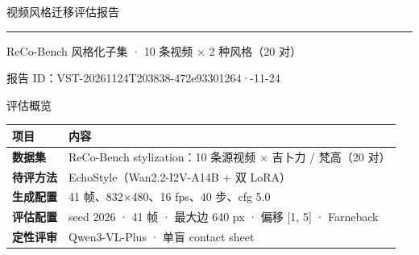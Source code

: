 \documentclass[aspectratio=169,11pt]{beamer}
\newcommand{\headrow}[1]{\color{white}\bfseries #1}
\begin{document}
\begin{frame}[plain]
\vspace{2.2cm}
{\color{white} 视频风格迁移评估报告\par}
\vspace{0.45cm}
{\color{gold}\rule{6cm}{2pt}}
\vspace{0.55cm}

{\large\color{white} ReCo-Bench 风格化子集 · 10 条视频 × 2 种风格（20 对）\par}
\vspace{0.25cm}
{\small\color{white!70!navy} 报告 ID：VST-20261124T203838-472e93301264\quad·-11-24}\par
\end{frame}


\begin{frame}{评估概览}
\small
\begin{tabularx}{\textwidth}{>{\bfseries}p{2.2cm}X}
\toprule
\rowcolor{navy}\headrow{项目} & \headrow{内容} \\
\midrule
数据集 & ReCo-Bench stylization：10 条源视频 × 吉卜力 / 梵高（20 对） \\
待评方法 & EchoStyle（Wan2.2-I2V-A14B + 双 LoRA） \\
生成配置 & 41 帧、832×480、16 fps、40 步、cfg 5.0 \\
评估配置 & seed 2026 · 41 帧 · 最大边 640 px · 偏移 [1, 5] · Farneback \\
定性评审 & Qwen3-VL-Plus · 单盲 contact sheet \\
\bottomrule
\end{tabularx}
\end{frame}
\end{document}
